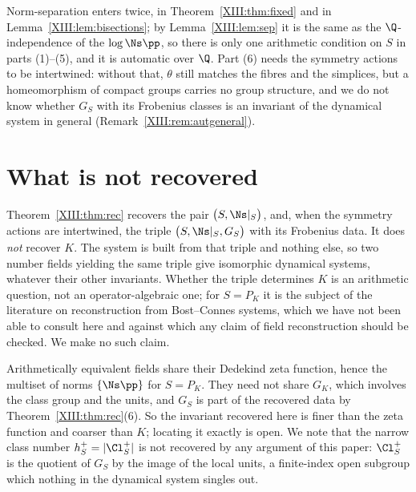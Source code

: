 \begin{remark}\label{XIII:rem:indep}
Norm-separation enters twice, in Theorem~\ref{XIII:thm:fixed} and in
Lemma~\ref{XIII:lem:bisections}; by Lemma~\ref{XIII:lem:sep} it is the same as the $\Q$-independence
of the $\log\Ns\pp$, so there is only one arithmetic condition on $S$ in parts (1)--(5), and
it is automatic over $\Q$. Part (6) needs the symmetry actions to be intertwined: without
that, $\theta$ still matches the fibres and the simplices, but a homeomorphism of compact
groups carries no group structure, and we do not know whether $G_S$ with its Frobenius
classes is an invariant of the dynamical system in general (Remark~\ref{XIII:rem:autgeneral}).
\end{remark}

\section{What is not recovered}

\begin{remark}\label{XIII:rem:field}
Theorem~\ref{XIII:thm:rec} recovers the pair $\bigl(S,\Ns|_S\bigr)$, and, when the symmetry
actions are intertwined, the triple $\bigl(S,\Ns|_S,G_S\bigr)$ with its Frobenius data. It does
\emph{not} recover $K$. The system is built from that triple and nothing else, so two
number fields yielding the same triple give isomorphic dynamical systems, whatever their
other invariants. Whether the triple determines $K$ is an arithmetic question, not an
operator-algebraic one; for $S=P_K$ it is the subject of the literature on reconstruction from
Bost--Connes systems, which we have not been able to consult here and against which any claim
of field reconstruction should be checked. We make no such claim.
\end{remark}

\begin{remark}\label{XIII:rem:arith}
Arithmetically equivalent fields share their Dedekind zeta function, hence the multiset of
norms $\{\Ns\pp\}$ for $S=P_K$. They need not share $G_K$, which involves the class group and
the units, and $G_S$ is part of the recovered data by
Theorem~\ref{XIII:thm:rec}(6). So the invariant recovered here is finer than the zeta function and
coarser than $K$; locating it exactly is open. We note that the narrow class number
$h^+_S=|\Cl^+_S|$ is not recovered by any argument of this paper: $\Cl^+_S$ is the quotient of
$G_S$ by the image of the local units, a finite-index open subgroup which nothing in the
dynamical system singles out.
\end{remark}

